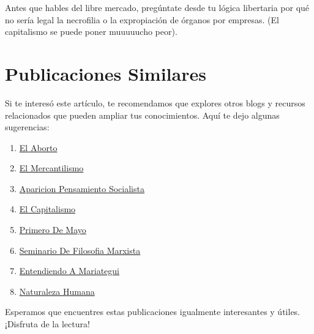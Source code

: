 \documentclass[
  jou,
  floatsintext,
  longtable,
  a4paper,
  nolmodern,
  notxfonts,
  notimes,
  12pt,
  colorlinks=true,linkcolor=blue,citecolor=blue,urlcolor=blue]{apa7}
\providecommand{\tightlist}{%
  \setlength{\itemsep}{0pt}\setlength{\parskip}{0pt}}
\begin{document}
Antes que hables del libre mercado, pregúntate desde tu lógica
libertaria por qué no sería legal la necrofilia o la expropiación de
órganos por empresas. (El capitalismo se puede poner muuuuucho peor).

\section{Publicaciones Similares}\label{publicaciones-similares}

Si te interesó este artículo, te recomendamos que explores otros blogs y
recursos relacionados que pueden ampliar tus conocimientos. Aquí te dejo
algunas sugerencias:

\begin{enumerate}
\def\labelenumi{\arabic{enumi}.}
\tightlist
\item
  \href{https://dialectica-y-mercado.netlify.app/posts/2015-05-14-el-aborto/index.pdf}{}
  \href{https://dialectica-y-mercado.netlify.app/posts/2015-05-14-el-aborto}{El
  Aborto}
\item
  \href{https://dialectica-y-mercado.netlify.app/posts/2017-05-23-el-mercantilismo/index.pdf}{}
  \href{https://dialectica-y-mercado.netlify.app/posts/2017-05-23-el-mercantilismo}{El
  Mercantilismo}
\item
  \href{https://dialectica-y-mercado.netlify.app/posts/2018-04-23-aparicion-pensamiento-socialista/index.pdf}{}
  \href{https://dialectica-y-mercado.netlify.app/posts/2018-04-23-aparicion-pensamiento-socialista}{Aparicion
  Pensamiento Socialista}
\item
  \href{https://dialectica-y-mercado.netlify.app/posts/2023-03-03-el-capitalismo/index.pdf}{}
  \href{https://dialectica-y-mercado.netlify.app/posts/2023-03-03-el-capitalismo}{El
  Capitalismo}
\item
  \href{https://dialectica-y-mercado.netlify.app/posts/2023-04-29-primero-de-mayo/index.pdf}{}
  \href{https://dialectica-y-mercado.netlify.app/posts/2023-04-29-primero-de-mayo}{Primero
  De Mayo}
\item
  \href{https://dialectica-y-mercado.netlify.app/posts/2023-05-19-seminario-de-filosofia-marxista/index.pdf}{}
  \href{https://dialectica-y-mercado.netlify.app/posts/2023-05-19-seminario-de-filosofia-marxista}{Seminario
  De Filosofia Marxista}
\item
  \href{https://dialectica-y-mercado.netlify.app/posts/2023-06-09-entendiendo-a-mariategui/index.pdf}{}
  \href{https://dialectica-y-mercado.netlify.app/posts/2023-06-09-entendiendo-a-mariategui}{Entendiendo
  A Mariategui}
\item
  \href{https://dialectica-y-mercado.netlify.app/posts/2023-06-09-naturaleza-humana/index.pdf}{}
  \href{https://dialectica-y-mercado.netlify.app/posts/2023-06-09-naturaleza-humana}{Naturaleza
  Humana}
\end{enumerate}

Esperamos que encuentres estas publicaciones igualmente interesantes y
útiles. ¡Disfruta de la lectura!
\end{document}
